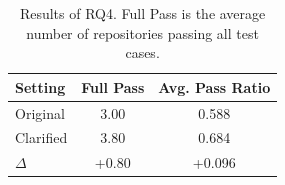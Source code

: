 
\begin{table}[t]
\centering
\caption{Results of RQ4. Full Pass is the average number of repositories passing all test cases.}
\label{tab:rq4_main_result}
\footnotesize
\setlength{\tabcolsep}{6pt}
\begin{tabular*}{\columnwidth}{@{\extracolsep{\fill}}lcc@{}}
\toprule
\textbf{Setting} & \textbf{Full Pass}  & \textbf{Avg. Pass Ratio} \\
\midrule
Original & 3.00  & 0.588 \\
Clarified & 3.80  & 0.684 \\
$\Delta$ & +0.80 & +0.096 \\
\bottomrule
\end{tabular*}
\end{table}



